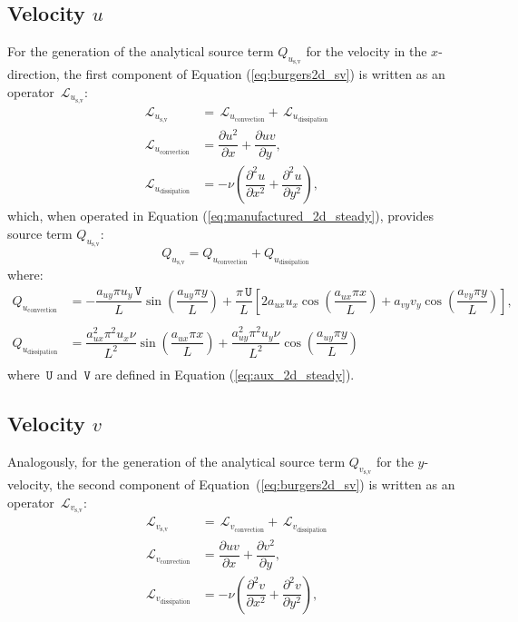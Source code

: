 \documentclass[10pt]{article}
\newcommand{\diff}[2] {\dfrac{\partial #1}{\partial #2}}
\newcommand{\Lo}{\,\mathcal{L}}
\newcommand{\U}{\,\mathtt{U}}
\newcommand{\V}{\,\mathtt{V}}
\begin{document}
\subsection{Velocity $u$}

For the generation of the analytical source term $Q_{u_\text{s,v}}$ for the velocity in the $x$-direction, the first component of Equation  (\ref{eq:burgers2d_sv}) is written as an  operator $\Lo_{u_\text{s,v}}$:
\begin{equation*}
\begin{split}
\Lo_{u_\text{s,v}}&= \Lo_{u_\text{convection}}+\Lo_{u_\text{dissipation}}\\
\Lo_{u_\text{convection}}&= \diff{ u^2 }{x}+\diff{uv}{y},\\
\Lo_{u_\text{dissipation}}&=-\nu \left( \diff{^2u}{ x^2}+ \diff{^2u }{y^2}\right),
\end{split}
\end{equation*}
which, when operated in Equation (\ref{eq:manufactured_2d_steady}), provides source term $Q_{u_\text{s,v}}$:
$$Q_{u_\text{s,v}}= Q_{u_\text{convection}}+Q_{u_\text{dissipation}}$$
where:
\begin{equation}
\begin{split}
Q_{u_\text{convection}} &= -\dfrac{a_{uy} \pi u_y \V}{L} \sin\left(\dfrac{a_{uy} \pi y}{L}\right)+\dfrac{\pi \U}{L}\left[2 a_{ux} u_x \cos\left(\dfrac{a_{ux} \pi x}{L}\right)+a_{vy} v_y \cos\left(\dfrac{a_{vy} \pi y}{L}\right)\right] , \\  
%
&\\
%
Q_{u_\text{dissipation}} &= \dfrac{a_{ux}^2 \pi^2 u_x \nu}{L^2} \sin\left(\dfrac{a_{ux} \pi x}{L}\right)+\dfrac{a_{uy}^2 \pi^2 u_y \nu}{L^2} \cos\left(\dfrac{a_{uy} \pi y}{L}\right)\\  
\end{split}
\end{equation}
where $\U$ and $\V$ are defined in Equation (\ref{eq:aux_2d_steady}).


\subsection{Velocity $v$}
Analogously, for the generation of the analytical source term $Q_{v_\text{s,v}}$ for the $y$-velocity, the second component of  Equation~(\ref{eq:burgers2d_sv}) is written as an  operator $\Lo_{v_\text{s,v}}$:
\begin{equation*}
\begin{split}
\Lo_{v_\text{s,v}}&= \Lo_{v_\text{convection}}+\Lo_{v_\text{dissipation}}\\
\Lo_{v_\text{convection}}&=\diff{ u v}{x} + \diff{  v^2 }{y},\\
\Lo_{v_\text{dissipation}}&=-\nu \left( \diff{^2v}{ x^2}+ \diff{^2v }{y^2}\right),
\end{split}
\end{equation*}
\end{document}
